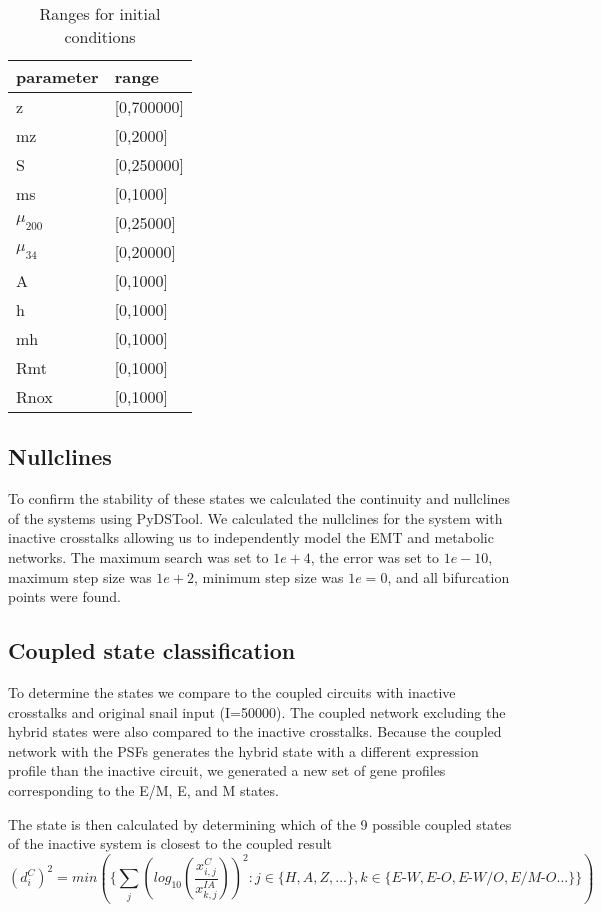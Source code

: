 \documentclass{article}
\begin{document}
\begin{table}[ht]
\begin{tabular}{l|l}
parameter&range\\
\hline
z & [0,700000]\\
mz & [0,2000]\\
S & [0,250000]\\
ms & [0,1000]\\
$\mu_{200}$ & [0,25000]\\
$\mu_{34}$ & [0,20000]\\
A & [0,1000]\\
h & [0,1000]\\
mh & [0,1000]\\
Rmt & [0,1000]\\
Rnox & [0,1000]\\
\hline
\end{tabular}
\caption{Ranges for initial conditions}
\label{table:ranges}
\end{table}


\FloatBarrier
\subsection{Nullclines}
To confirm the stability of these states we calculated the continuity and nullclines of the systems using PyDSTool\cite{Pydstool}.  
We calculated the nullclines for the system with inactive crosstalks allowing us to independently model the EMT and metabolic networks. The maximum search was set to $1e+4$, the error was set to $1e-10$, maximum step size was  $1e+2$, minimum step size was $1e=0$, and all bifurcation points were found.

\subsection{Coupled state classification}
To determine the states we compare to the coupled circuits with inactive crosstalks and original snail input (I=50000). 
The coupled network excluding the hybrid states were also compared to the inactive crosstalks. 
Because the coupled network with the PSFs generates the hybrid state with a different expression profile than the inactive circuit, we generated a new set of gene profiles corresponding to the E/M, E, and M states. 

The state is then calculated by determining which of the 9 possible coupled states of the inactive system is closest to the coupled result
\begin{equation}
(d_i^C)^2 = min(\{ \sum_j (log_{10}(\frac{x_{i,j}^C}{ x_{k,j}^{IA}}))^2 : j\in \{H,A,Z,... \} , k\in \{E\textrm{-}W,E\textrm{-}O, E\textrm{-}W/O, E/M\textrm{-}O...\}\} )
\end{equation}
\end{document}
